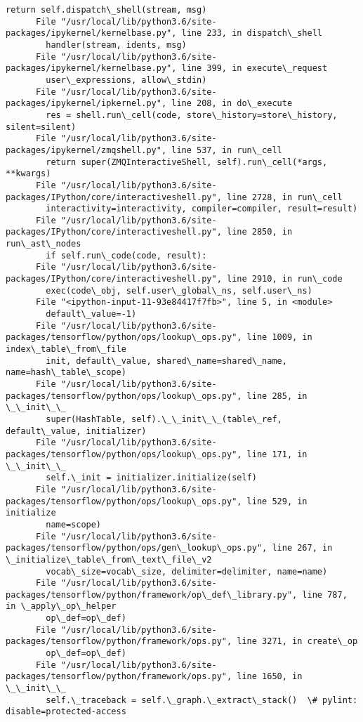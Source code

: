 \documentclass[11pt]{article}
\begin{document}
\begin{Verbatim}[commandchars=\\\{\}]
        return self.dispatch\_shell(stream, msg)
      File "/usr/local/lib/python3.6/site-packages/ipykernel/kernelbase.py", line 233, in dispatch\_shell
        handler(stream, idents, msg)
      File "/usr/local/lib/python3.6/site-packages/ipykernel/kernelbase.py", line 399, in execute\_request
        user\_expressions, allow\_stdin)
      File "/usr/local/lib/python3.6/site-packages/ipykernel/ipkernel.py", line 208, in do\_execute
        res = shell.run\_cell(code, store\_history=store\_history, silent=silent)
      File "/usr/local/lib/python3.6/site-packages/ipykernel/zmqshell.py", line 537, in run\_cell
        return super(ZMQInteractiveShell, self).run\_cell(*args, **kwargs)
      File "/usr/local/lib/python3.6/site-packages/IPython/core/interactiveshell.py", line 2728, in run\_cell
        interactivity=interactivity, compiler=compiler, result=result)
      File "/usr/local/lib/python3.6/site-packages/IPython/core/interactiveshell.py", line 2850, in run\_ast\_nodes
        if self.run\_code(code, result):
      File "/usr/local/lib/python3.6/site-packages/IPython/core/interactiveshell.py", line 2910, in run\_code
        exec(code\_obj, self.user\_global\_ns, self.user\_ns)
      File "<ipython-input-11-93e84417f7fb>", line 5, in <module>
        default\_value=-1)
      File "/usr/local/lib/python3.6/site-packages/tensorflow/python/ops/lookup\_ops.py", line 1009, in index\_table\_from\_file
        init, default\_value, shared\_name=shared\_name, name=hash\_table\_scope)
      File "/usr/local/lib/python3.6/site-packages/tensorflow/python/ops/lookup\_ops.py", line 285, in \_\_init\_\_
        super(HashTable, self).\_\_init\_\_(table\_ref, default\_value, initializer)
      File "/usr/local/lib/python3.6/site-packages/tensorflow/python/ops/lookup\_ops.py", line 171, in \_\_init\_\_
        self.\_init = initializer.initialize(self)
      File "/usr/local/lib/python3.6/site-packages/tensorflow/python/ops/lookup\_ops.py", line 529, in initialize
        name=scope)
      File "/usr/local/lib/python3.6/site-packages/tensorflow/python/ops/gen\_lookup\_ops.py", line 267, in \_initialize\_table\_from\_text\_file\_v2
        vocab\_size=vocab\_size, delimiter=delimiter, name=name)
      File "/usr/local/lib/python3.6/site-packages/tensorflow/python/framework/op\_def\_library.py", line 787, in \_apply\_op\_helper
        op\_def=op\_def)
      File "/usr/local/lib/python3.6/site-packages/tensorflow/python/framework/ops.py", line 3271, in create\_op
        op\_def=op\_def)
      File "/usr/local/lib/python3.6/site-packages/tensorflow/python/framework/ops.py", line 1650, in \_\_init\_\_
        self.\_traceback = self.\_graph.\_extract\_stack()  \# pylint: disable=protected-access
    

\end{Verbatim}
\end{document}
